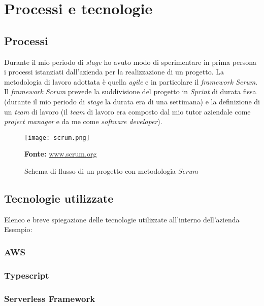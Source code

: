 \section{Processi e tecnologie}
\subsection{Processi}
Durante il mio periodo di \textit{stage} ho avuto modo di sperimentare in prima persona i processi istanziati dall'azienda per la realizzazione di un progetto.
La metodologia di lavoro adottata è quella \textit{agile} e in particolare il \textit{framework Scrum}.\\ 
Il \textit{framework Scrum} prevede la suddivisione del progetto in \textit{Sprint} di durata fissa (durante il mio periodo di \textit{stage} la durata era di una settimana) e la definizione di un \textit{team} di lavoro (il \textit{team} di lavoro era composto dal mio tutor aziendale come \textit{project manager} e da me come \textit{software developer}).
\begin{figure}[H]
    \centering
    \texttt{[image: scrum.png]}
    \caption{Schema di flusso di un progetto con metodologia \textit{Scrum}}
    \small \textbf{Fonte:} \url{www.scrum.org}
    \label{fig:scrum}
\end{figure}
\subsection{Tecnologie utilizzate}
Elenco e breve spiegazione delle tecnologie utilizzate all'interno dell'azienda
Esempio:
\subsubsection{AWS}
\subsubsection{Typescript}
\subsubsection{Serverless Framework}



